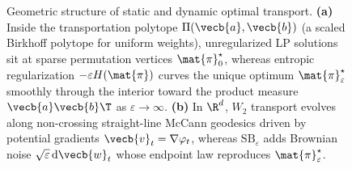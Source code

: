 \documentclass[../../../../master.tex]{subfiles}
\begin{document}
\begin{figure}[htbp]
  \caption{Geometric structure of static and dynamic optimal transport. \textbf{(a)} Inside the transportation polytope $\Pi(\vecb{a},\vecb{b})$ (a scaled Birkhoff polytope for uniform weights), unregularized LP solutions sit at sparse permutation vertices $\mat{\pi}_0^\star$, whereas entropic regularization $-\varepsilon H(\mat{\pi})$ curves the unique optimum $\mat{\pi}_\varepsilon^\star$ smoothly through the interior toward the product measure $\vecb{a}\vecb{b}\T$ as $\varepsilon \to \infty$. \textbf{(b)} In $\R^d$, $W_2$ transport evolves along non-crossing straight-line McCann geodesics driven by potential gradients $\vecb{v}_t = \nabla\varphi_t$, whereas $\mathrm{SB}_\varepsilon$ adds Brownian noise $\sqrt{\varepsilon}\,\mathrm{d}\vecb{w}_t$ whose endpoint law reproduces $\mat{\pi}_\varepsilon^\star$.}
  \label{fig:ot:geometry_birkhoff_dynamics}
\end{figure}
\end{document}
